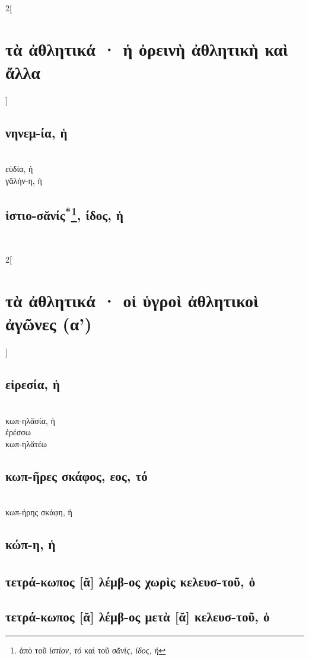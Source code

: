 \documentclass{book}
\begin{document}
\begin{multicols}{2}[\section{τὰ ἀθλητικά · ἡ ὀρεινὴ ἀθλητικὴ καὶ ἄλλα}]
\subsection{νηνεμ-ία, ἡ}  ~\\
εὐδία, ἡ  ~\\
γᾰλήν-η, ἡ 
\subsection{ἱστιο-σᾰνίς\textsuperscript{*}\protect\footnote{ἀπὸ τοῦ \emph{ἱστίον, τό} καὶ τοῦ \emph{σᾰνίς, ίδος, ἡ}}, ίδος, ἡ} 
~
\end{multicols}
\newpage  
\begin{multicols}{2}[\section{τὰ ἀθλητικά · οἱ ὑγροὶ ἀθλητικοὶ ἀγῶνες (α')}]
{\renewcommand \thesubsection {\thesection} }
\subsection{εἰρεσία, ἡ}   ~\\
κωπ-ηλᾰσία, ἡ  ~\\
ἐρέσσω  ~\\
κωπ-ηλᾰτέω 
\subsection{κωπ-ῆρες σκάφος, εος, τό}  ~\\
κωπ-ήρης σκάφη, ἡ
\subsection{κώπ-η, ἡ}
\subsection{τετρά-κωπος\textsuperscript{\textdagger} [ᾰ] λέμβ-ος χωρὶς κελευσ-τοῦ, ὁ}
\subsection{τετρά-κωπος [ᾰ] λέμβ-ος μετὰ [ᾰ] κελευσ-τοῦ, ὁ}

\end{multicols}
\end{document}
